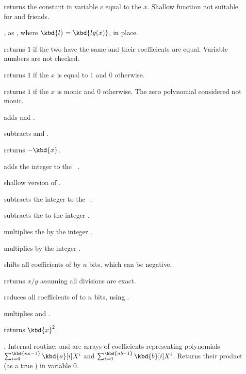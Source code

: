  returns the constant  in
variable $v$ equal to the  $x$. Shallow function not suitable for
 and friends.

, as , where
$\kbd{l} = \kbd{lg(x)}$, in place.

 returns $1$ if the two  have
the same  and their coefficients are equal. Variable numbers are
not checked.

 returns $1$ if the  $x$ is equal to $1$
and $0$ otherwise.

 returns $1$ if the  $x$ is monic and $0$
otherwise.  The zero polynomial considered not monic.

 adds  and .

 subtracts  and .

 returns $-\kbd{x}$.

 adds the integer  to the
~.

 shallow version of .

 subtracts the integer  to the
~.

 subtracts the   to the
integer .

 multiplies the   by the
integer .

 multiplies  by the integer .

 shifts all coefficients of  by $n$
bits, which can be negative.

 returns $x/y$ assuming all divisions
are exact.

 reduces all coefficients of  to
$n$ bits, using .

 multiplies  and .

 returns $\kbd{x}^2$.

. Internal routine:
 and  are arrays of coefficients representing polynomials
$\sum_{i = 0}^{\kbd{na-1}} \kbd{a}[i] X^i$ and
$\sum_{i = 0}^{\kbd{nb-1}} \kbd{b}[i] X^i$. Returns their product (as a true
) in variable $0$.

